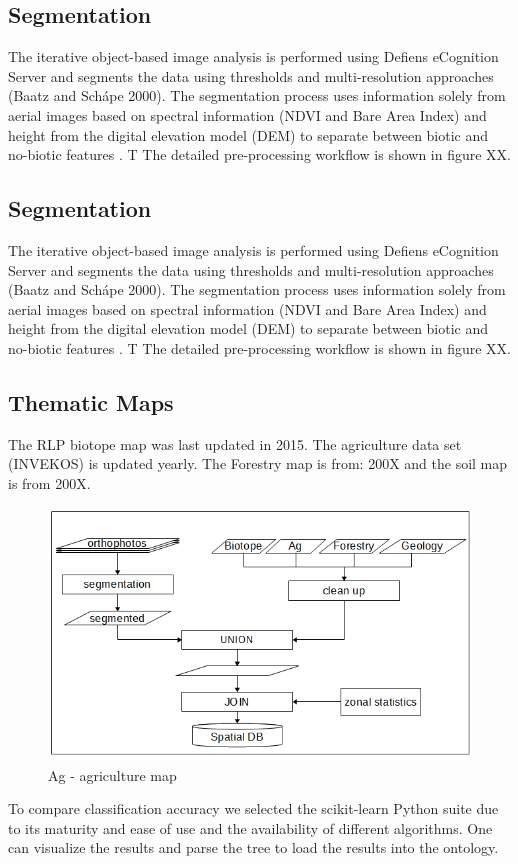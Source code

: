 \documentclass[authoryear, review,12pt,number]{elsarticle}
\begin{document}
\subsection{Segmentation}
The iterative object-based image analysis is performed using Defiens eCognition
Server and segments the data using thresholds and multi-resolution approaches
(Baatz and Sch\'ape 2000). The segmentation process uses information solely
from aerial images based on spectral information (NDVI and Bare Area Index) and
height from the digital elevation model (DEM) to separate
between biotic and no-biotic features \citep{Tintrup2015}. T 
The detailed pre-processing workflow is shown in figure XX.
\subsection{Segmentation} The iterative object-based image analysis is
performed using Defiens eCognition Server and segments the data using
thresholds and multi-resolution approaches (Baatz and Sch\'ape 2000). The
segmentation process uses information solely from aerial images based on
spectral information (NDVI and Bare Area Index) and height from the digital
elevation model (DEM) to separate between biotic and no-biotic features
\citep{Tintrup2015}. T The detailed pre-processing workflow is shown in figure
XX.
\subsection{Thematic Maps} The RLP biotope map was last updated in 2015. The
agriculture data set (INVEKOS) is updated yearly. The Forestry map is from:
200X and the soil map is from 200X.

\begin{figure} \includegraphics[width=1\textwidth]{diagrams/pre_processing.png}
    \caption{Ag - agriculture map} \end{figure}
To compare classification accuracy we selected the scikit-learn Python suite
\citep{scikit-learn} due to its maturity and ease of use and the availability of
different algorithms. One can visualize the results and parse the tree to load
the results into the ontology.
\end{document}

